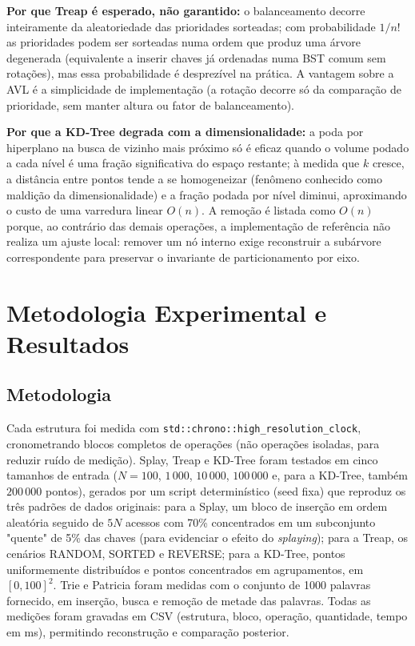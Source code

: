 \documentclass[conference]{IEEEtran}
\begin{document}
\textbf{Por que Treap é esperado, não garantido:} o balanceamento decorre inteiramente da aleatoriedade das prioridades sorteadas; com probabilidade $1/n!$ as prioridades podem ser sorteadas numa ordem que produz uma árvore degenerada (equivalente a inserir chaves já ordenadas numa BST comum sem rotações), mas essa probabilidade é desprezível na prática. A vantagem sobre a AVL é a simplicidade de implementação (a rotação decorre só da comparação de prioridade, sem manter altura ou fator de balanceamento).

\textbf{Por que a KD-Tree degrada com a dimensionalidade:} a poda por hiperplano na busca de vizinho mais próximo só é eficaz quando o volume podado a cada nível é uma fração significativa do espaço restante; à medida que $k$ cresce, a distância entre pontos tende a se homogeneizar (fenômeno conhecido como maldição da dimensionalidade) e a fração podada por nível diminui, aproximando o custo de uma varredura linear $O(n)$. A remoção é listada como $O(n)$ porque, ao contrário das demais operações, a implementação de referência não realiza um ajuste local: remover um nó interno exige reconstruir a subárvore correspondente para preservar o invariante de particionamento por eixo.

\section{Metodologia Experimental e Resultados}

\subsection{Metodologia}
Cada estrutura foi medida com \texttt{std::chrono::high\_resolution\_clock}, cronometrando blocos completos de operações (não operações isoladas, para reduzir ruído de medição). Splay, Treap e KD-Tree foram testados em cinco tamanhos de entrada ($N = 100$, $1\,000$, $10\,000$, $100\,000$ e, para a KD-Tree, também $200\,000$ pontos), gerados por um script determinístico (seed fixa) que reproduz os três padrões de dados originais: para a Splay, um bloco de inserção em ordem aleatória seguido de $5N$ acessos com 70\% concentrados em um subconjunto "quente" de 5\% das chaves (para evidenciar o efeito do \textit{splaying}); para a Treap, os cenários RANDOM, SORTED e REVERSE; para a KD-Tree, pontos uniformemente distribuídos e pontos concentrados em agrupamentos, em $[0,100]^2$. Trie e Patricia foram medidas com o conjunto de 1000 palavras fornecido, em inserção, busca e remoção de metade das palavras. Todas as medições foram gravadas em CSV (estrutura, bloco, operação, quantidade, tempo em ms), permitindo reconstrução e comparação posterior.
\end{document}
